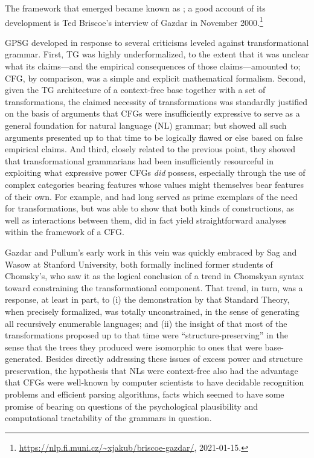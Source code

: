 \documentclass[output=paper
 	        ,biblatex
                ,babelshorthands
                ,newtxmath
                ,draftmode
                ,colorlinks, citecolor=brown
]{langscibook}
\begin{document}
\noindent
The framework that emerged became known as ; a good account of its development is Ted Briscoe's interview of Gazdar in November 2000.\footnote{\url{https://nlp.fi.muni.cz/~xjakub/briscoe-gazdar/}, 2021-01-15.}

GPSG developed in response to several criticisms leveled against transformational grammar. First, TG
was highly underformalized, to the extent that it was unclear what its claims---and the empirical
consequences of those claims---amounted to; CFG, by comparison, was a simple and explicit
mathematical formalism. Second, given the TG architecture of a context-free base together with a set
of transformations, the claimed necessity of transformations was standardly justified on the basis
of arguments that CFGs were insufficiently expressive to serve as a general foundation for natural
language (NL) grammar; but \citet{PG82a-u} showed all such arguments presented up to that time to be
logically flawed or else based on false empirical claims. And third, closely related to the previous
point, they showed that transformational grammarians had been insufficiently resourceful in
exploiting what expressive power CFGs \emph{did} possess, especially through the use of complex
categories bearing features whose values might themselves bear features of their own.  For example,
 and  had long served as prime
exemplars of the need for transformations, but \citet{Gazdar81a} was able to show that both kinds of
constructions, as well as interactions between them, did in fact yield straightforward analyses
within the framework of a CFG.
 
Gazdar and Pullum's early work in this vein was quickly embraced by Sag and Wasow at Stanford
University, both formally inclined former students of Chomsky's, who saw it as the logical
conclusion of a trend in Chomskyan syntax toward constraining the transformational component. That
trend, in turn, was a response, at least in part, to (i) the demonstration by \citet{PR73a-u} that
 Standard Theory, when precisely formalized, was totally unconstrained, in the
sense of generating all recursively enumerable languages; and (ii) the insight of
\citet{Emonds76a-u} that most of the transformations proposed up to that time were
``structure-preserving'' in the sense that the trees they produced were isomorphic to ones that were
base-generated. Besides directly addressing these issues of excess power and structure preservation,
the hypothesis that NLs were context-free also had the advantage that CFGs were well-known by
computer scientists to have decidable recognition problems and efficient parsing algorithms, facts
which seemed to have some promise of bearing on questions of the psychological plausibility and
computational tractability of the grammars in question.
\end{document}
